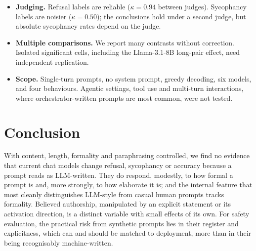 \begin{itemize}
\item \textbf{Judging.} Refusal labels are reliable ($\kappa=0.94$ between judges). Sycophancy labels are noisier ($\kappa=0.50$); the conclusions hold under a second judge, but absolute sycophancy rates depend on the judge.
\item \textbf{Multiple comparisons.} We report many contrasts without correction. Isolated significant cells, including the Llama-3.1-8B long-pair effect, need independent replication.
\item \textbf{Scope.} Single-turn prompts, no system prompt, greedy decoding, six models, and four behaviours. Agentic settings, tool use and multi-turn interactions, where orchestrator-written prompts are most common, were not tested.
\end{itemize}

\section{Conclusion}

With content, length, formality and paraphrasing controlled, we find no evidence that current chat models change refusal, sycophancy or accuracy because a prompt reads as LLM-written. They do respond, modestly, to how formal a prompt is and, more strongly, to how elaborate it is; and the internal feature that most cleanly distinguishes LLM-style from casual human prompts tracks formality. Believed authorship, manipulated by an explicit statement or its activation direction, is a distinct variable with small effects of its own. For safety evaluation, the practical risk from synthetic prompts lies in their register and explicitness, which can and should be matched to deployment, more than in their being recognisably machine-written.
